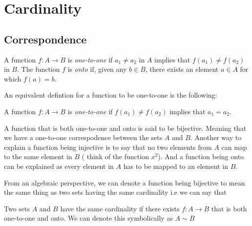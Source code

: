 


\section{Cardinality}

\subsection{Correspondence}

\begin{tcolorbox}
\begin{defn}
    A function \( f: A \to B \) is \textit{one-to-one} if \( a_1 \neq a_2 \) in \( A \) implies that 
    \( f(a_1) \neq f(a_2) \) in \( B \). The function \( f \) is \textit{onto} if, given any \( b \in B \), there exists an element \( a \in A \) for which \( f(a) = b\).
\end{defn}
\end{tcolorbox}

An equivalent defintion for a function to be one-to-one is the following:

\begin{tcolorbox}
\begin{defn}
    A function \( f: A \to B \) is \textit{one-to-one} if \( f(a_1) \neq f(a_2) \) implies that \( a_1 = a_2 \).
\end{defn}
\end{tcolorbox}
    
A function that is both one-to-one and onto is said to be bijective. Meaning that we have a one-to-one correspodence between the sets \( A \) and \( B \). Another way to explain a function being injective is to say that no two elements from \( A \) can map to the same element in \( B \) ( think of the function \( x^2\)). And a function being onto can be explained as every element in \( A \) has to be mapped to an element in \( B \).

From an algebraic perspective, we can denote a function being bijective to mean the same thing as two sets having the same cardinality i.e we can say that 

\begin{tcolorbox}
\begin{defn}
Two sets \( A \) and \( B \) have the same cardinality if there exists \( f: A \to B \) that is both one-to-one and onto. We can denote this symbolically as \( A \sim B\)
\end{defn}
\end{tcolorbox}

